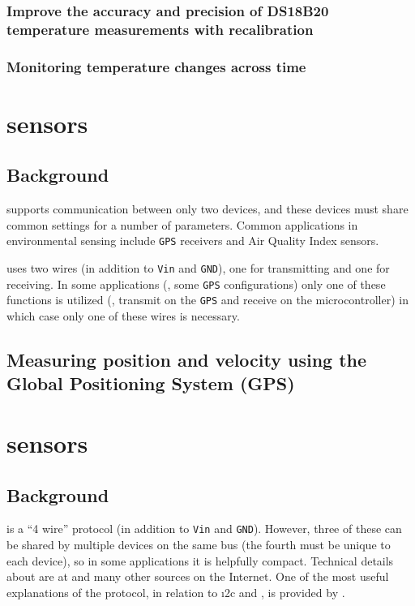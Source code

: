 \subsubsection{\color{gray} Improve the accuracy and precision of DS18B20 temperature measurements with recalibration \color{black}}
\subsubsection{\color{gray} Monitoring temperature changes across time \color{black}}



\section{\color{gray}\uart sensors \color{black}}
\subsection{\color{gray} Background \color{black}}
	\uart supports communication between only two devices, and these devices must share common settings for a number of parameters. %
Common applications in environmental sensing include \texttt{GPS} receivers and Air Quality Index sensors.

\uart uses two wires (in addition to \texttt{Vin} and \texttt{GND}), one for transmitting and one for receiving.
In some applications (\eg, some \texttt{GPS} configurations) only one of these functions is utilized (\eg, transmit on the \texttt{GPS} and receive on the microcontroller) in which case only one of these wires is necessary.
\subsection{\color{gray} Measuring position and velocity using the Global Positioning System (GPS) \color{black}}


\section{\spi sensors}
\subsection{Background}
\spi is a ``4 wire'' protocol (in addition to \texttt{Vin} and \texttt{GND}).
However, three of these can be shared by multiple devices on the same \spi bus (the fourth must be unique to each device), so in some applications it is helpfully compact.
Technical details about \spi are at  and many other sources on the Internet.
One of the most useful explanations of the \spi protocol, in relation to \i2c and \uart, is provided by .

